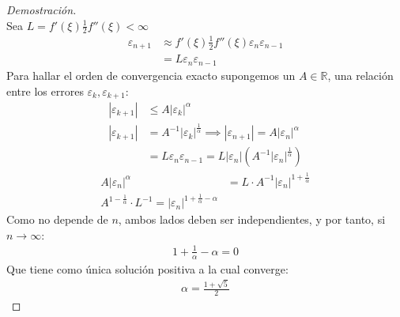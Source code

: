 \documentclass{article}
\begin{document}
\begin{proof}[Demostración]
\begin{equation}
    \end{equation}
    Sea $L=f'(\xi )\frac{1}{2}f''(\xi )<\infty$
    \begin{equation}
        \begin{split}
            \varepsilon _{n+1} &\approx f'(\xi )\frac{1}{2} f''(\xi )\varepsilon _{n}\varepsilon _{n-1}\\
            &= L \varepsilon _{n} \varepsilon _{n-1}
        \end{split}
    \end{equation}
    Para hallar el orden de convergencia exacto supongemos un $A \in \mathbb{R}$, una relación
    entre los errores $\varepsilon _{k}, \varepsilon _{k+1}$:
    \begin{equation}
        \begin{split}
            |\varepsilon _{k+1}| &\leq A |\varepsilon _{k}|^{\alpha }\\
            |\varepsilon _{k+1}| &= A^{-1}|\varepsilon _{k}|^{\frac{1}{\alpha }} \implies 
            |\varepsilon _{n+1}| = A |\varepsilon _{n}|^{\alpha }\\
            &= L \varepsilon _{n} \varepsilon _{n-1} = L |\varepsilon _{n}|
            (A^{-1}|\varepsilon _{n}|^{\frac{1}{\alpha }})
        \end{split}
    \end{equation}
    \begin{equation}
        \begin{split}
            A|\varepsilon _{n}|^{\alpha } &= L\cdot A^{-1}|\varepsilon _{n}|^{1+\frac{1}{\alpha }}\\
            A^{1-\frac{1}{\alpha }}\cdot L^{-1}=|\varepsilon _{n}|^{1+\frac{1}{\alpha }-\alpha }
        \end{split}
    \end{equation}
    Como no depende de $n$, ambos lados deben ser independientes, y por tanto, si $n \to  \infty$:
    \begin{equation}
        \begin{split}
            1+\frac{1}{\alpha }-\alpha =0
        \end{split}
    \end{equation}
    Que tiene como única solución positiva a la cual converge:
    \begin{equation}
        \begin{split}
            \boxed{\alpha = \frac{1+\sqrt{5}}{2}}
        \end{split}
    \end{equation}
\end{proof}
\end{document}
